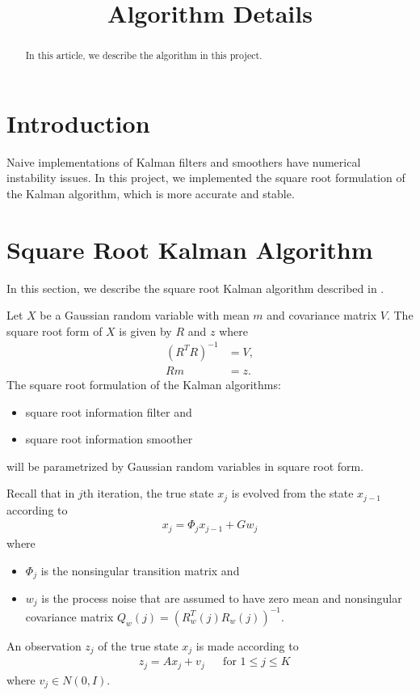 \documentclass[microtype]{gtpart}     %
\title{Algorithm Details}
\author{}
\theoremstyle{definition}
\begin{document}
\begin{abstract}    %

In this article, we describe the algorithm in this project.

\end{abstract}

\maketitle


\section{Introduction}

Naive implementations of Kalman filters and smoothers have numerical instability issues.
In this project, we implemented the square root formulation of the Kalman algorithm, which is more accurate and stable. 

\section{Square Root Kalman Algorithm}

In this section, we describe the square root Kalman algorithm described in \cite{bierman2006factorization}.

Let $X$ be a Gaussian random variable with mean $m$ and covariance matrix $V$.
The square root form of $X$ is given by $R$ and $z$ where
\begin{align*}
 (R^TR)^{-1} &= V, \\
 Rm &= z.
\end{align*}
The square root formulation of the Kalman algorithms:
\begin{itemize}
	\item square root information filter and
	\item square root information smoother
\end{itemize}
will be parametrized by Gaussian random variables in square root form.

Recall that in $j$th iteration, the true state $x_j$ is evolved from the state $x_{j-1}$ according to
\begin{align}
x_j = \Phi_j x_{j-1} + Gw_j \label{eq:predict}
\end{align}
where
\begin{itemize}
	\item $\Phi_j$ is the nonsingular transition matrix and
	\item $w_j$ is the process noise that are assumed to have zero mean and nonsingular covariance matrix 
	$Q_w(j)=(R^T_w(j)R_w(j))^{-1}$.
\end{itemize}
An observation $z_j$ of the true state $x_j$ is made according to
\begin{align*}
	&z_j = A x_j + v_j & &\text{for } 1\leq j \leq K
\end{align*}
where $v_j \in N(0, I)$.
\end{document}
